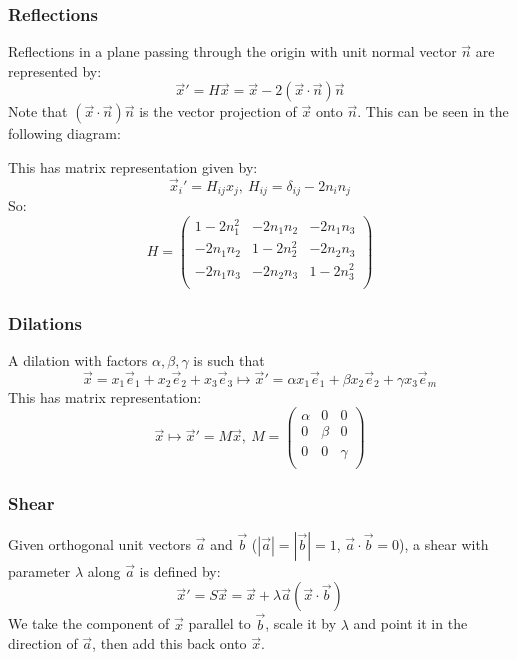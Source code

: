 \documentclass[../main.tex]{subfiles}
\begin{document}
\subsubsection{Reflections}
Reflections in a plane passing through the origin with unit normal vector $\vec{n}$ are represented by:
\[
  \vec{x}' = H\vec{x} = \vec{x} - 2(\vec{x} \cdot \vec{n})\vec{n}
\]
Note that $(\vec{x} \cdot \vec{n})\vec{n}$ is the vector projection of $\vec{x}$ onto $\vec{n}$.
This can be seen in the following diagram:
\begin{center}
\end{center}
This has matrix representation given by:
\[
  \vec{x}_i' = H_{i j}x_j,\ H_{i j} = \delta_{i j} - 2n_in_j
\]
So:
\[
  H = \begin{pmatrix}
  1-2n^{2}_{1} & -2n_1n_2 & -2n_1n_3 \\
  -2n_1n_2 & 1-2n^{2}_{2} & -2n_2n_3 \\
  -2n_1n_3 & -2n_2n_3 & 1-2n^{2}_{3} \\
  \end{pmatrix}
\]
\subsubsection{Dilations}
A dilation with factors $\alpha, \beta, \gamma$ is such that
\[
  \vec{x} = x_1 \vec{e}_1 + x_2 \vec{e}_2 + x_3 \vec{e}_3 \mapsto \vec{x}' = \alpha x_1 \vec{e}_1 + \beta x_2 \vec{e}_2 + \gamma x_3 \vec{e}_m
\]
This has matrix representation:
\[
  \vec{x} \mapsto \vec{x}' = M\vec{x},\
  M = \begin{pmatrix}
  \alpha & 0 & 0 \\
  0 & \beta & 0 \\
  0 & 0 & \gamma \\
  \end{pmatrix}
\]
\subsubsection{Shear}
Given orthogonal unit vectors $\vec{a}$ and $\vec{b}$ ($|\vec{a}| = |\vec{b}| = 1$, $\vec{a} \cdot \vec{b}  = 0$), a shear with parameter $\lambda$ along $\vec{a}$ is defined by:
\[
  \vec{x}' = S\vec{x} = \vec{x} + \lambda \vec{a} (\vec{x} \cdot \vec{b})
\]
We take the component of $\vec{x}$ parallel to $\vec{b}$, scale it by $\lambda$ and point it in the direction of $\vec{a}$, then add this back onto $\vec{x}$.
\end{document}
